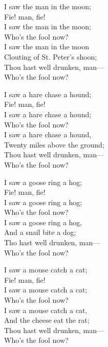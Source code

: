 

\begin{dcverse}\begin{patverse}
I saw the man in the moon;\\
Fie! man, fie!\\
I saw the man in the moon;\\
Who’s the fool now?\\
I saw the man in the moon\\
Clouting of St. Peter’s shoon;\\
Thou hast well drunken, man—\\
Who’s the fool now?
\end{patverse}

\begin{patverse}
I saw a hare chase a hound;\\
Fie! man, fie!\\
I saw a hare chase a hound;\\
Who’s the fool now?\\
I saw a hare chase a hound,\\
Twenty miles above the ground;\\
Thou hast well drunken, man—\\
Who’s the fool now?
\end{patverse}

\begin{patverse}
I saw a goose ring a hog;\\
Fie! man, fie!\\
I saw a goose ring a hog;\\
Who’s the fool now?\\
I saw a goose ring a hog,\\
And a snail bite a dog;\\
Tho hast well drunken, man—\\
Who’s the fool now?
\end{patverse}

\begin{patverse}
I saw a mouse catch a cat;\\
Fie! man, fie!\\
I saw a mouse catch a cat;\\
Who’s the fool now?\\
I saw a mouse catch a cat,\\
And the cheese eat the rat;\\
Thou hast well drunken, man—\\
Who’s the fool now?
\end{patverse}
\end{dcverse}

